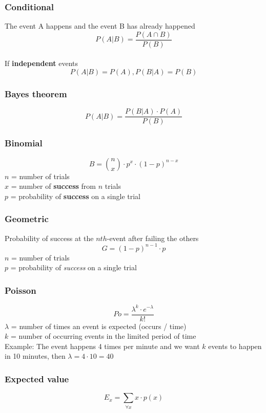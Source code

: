 \subsubsection*{Conditional} 
The event A happens and the event B has already happened
\[ P(A | B) = \frac{P(A \cap B)}{P(B)} \] \\
If \textbf{independent} events
\[ P(A|B) = P(A) , P(B|A) = P(B) \]

\subsubsection*{Bayes theorem}
\[ P(A|B) = \frac{ P(B | A) \cdot P(A) }{ P(B) } \]

\subsubsection*{Binomial}
\[ B = {n \choose x} \cdot p^{x} \cdot (1 - p)^{n-x} \]
$n$	=	number of trials \\
$x$	=	number of \textbf{success} from $n$ trials \\
$p$	=	probability of \textbf{success} on a single trial


\subsubsection*{Geometric}
Probability of success at the $nth$-event after failing the others
\[ G = (1 - p)^{n - 1} \cdot p \]
$n$	=	number of trials \\
$p$	=	probability of \emph{success} on a single trial


\subsubsection*{Poisson}
\[ Po = \frac{\lambda ^ k \cdot e ^ {-\lambda}}{k!} \]
$\lambda$ = number of times an event is expected (occurs / time)  \\
$k$ = number of occurring events in the limited period of time \\

Example: The event happens 4 times per minute and we want $k$ events to happen in 10 minutes, then $\lambda = 4 \cdot 10 = 40$

\subsubsection*{Expected value}
\[ E_x = \sum_{\forall x} x \cdot p(x) \]

